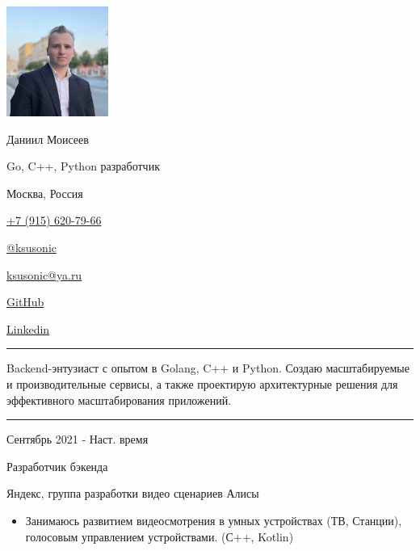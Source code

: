 \documentclass[a4paper,10pt]{article}
\newlength{\cvcolumngapwidth}
\newlength{\cvleftcolumnwidth}
\newlength{\cvrightcolumnwidth}
\newcommand{\cvnamestyle}[1]{{\Large\cvnamefont\textcolor{cvnamecolor}{#1}}}
\newcommand{\cvsectionstyle}[1]{{\normalsize\cvsectionfont\textcolor{cvsectioncolor}{#1}}}
\newcommand{\cvtitlestyle}[1]{{\large\cvtitlefont\textcolor{cvtitlecolor}{#1}}}
\newcommand{\cvdurationstyle}[1]{{\small\cvdurationfont\textcolor{cvdurationcolor}{#1}}}
\newlength{\cvafteritemskipamount}
\newlength{\cvaftersectionskipamount}
\newlength{\cvafternameskipamount}
\newlength{\cvafterpersonalinfolineskipamount}
\newlength{\cvaftertitleskipamount}
\newlength{\cvparskip}
\newcommand{\cvpersonalinfo}[2]{
    \begin{minipage}[t]{\cvleftcolumnwidth}
        \vspace{0mm} %
        \raggedleft #1
    \end{minipage}%
    \hspace{\cvcolumngapwidth}%
    \begin{minipage}[t]{\cvrightcolumnwidth}
        \vspace{0mm} %
        #2
    \end{minipage}

    \vspace{\cvafteritemskipamount}
}
\newcommand{\cvname}[1]{
    \cvnamestyle{#1}

    \vspace{\cvafternameskipamount}
}
\newcommand{\cvpersonalinfolinewithicon}[3]{
    \raisebox{.5\fontcharht\font`E-.5\height}{\texttt{[image: \#2]}}
    #3

    \vspace{\cvafterpersonalinfolineskipamount}
}
\newcommand{\cvsection}[1]{
    \begin{minipage}[t]{\cvleftcolumnwidth}
        \raggedleft\cvsectionstyle{#1}
    \end{minipage}%
    \hspace{\cvcolumngapwidth}%
    \begin{minipage}[t]{\cvrightcolumnwidth}
        \textcolor{cvrulecolor}{\rule{\cvrightcolumnwidth}{0.3mm}}
    \end{minipage}

    \vspace{\cvaftersectionskipamount}
}
\newcommand{\cvitem}[2]{
    \begin{minipage}[t]{\cvleftcolumnwidth}
        \raggedleft #1
    \end{minipage}%
    \hspace{\cvcolumngapwidth}%
    \begin{minipage}[t]{\cvrightcolumnwidth}
        \setlength{\parskip}{\cvparskip} #2
    \end{minipage}

    \vspace{\cvafteritemskipamount}
}
\newcommand{\cvtitle}[1]{
    \cvtitlestyle{#1}

    \vspace{\cvaftertitleskipamount}
    \vspace{-\cvparskip}
}
\begin{document}

\cvpersonalinfo{
    \includegraphics[height=36mm]{img/dan.jpg}
}{
    \cvname{Даниил Моисеев}
    \cvdurationstyle {Go, C++, Python разработчик}

    \cvpersonalinfolinewithicon{height=4mm}{img/072-location.pdf}{Москва, Россия}

    \cvpersonalinfolinewithicon{height=4mm}{img/067-phone.pdf}{
        \href{tel:+79156207966}{+7 (915) 620-79-66}
    }

    \cvpersonalinfolinewithicon{height=4mm}{img/telegram.png}{
        \href{https://t.me/ksusonic}{@ksusonic}
    }

    \cvpersonalinfolinewithicon{height=4mm}{img/070-envelop.pdf}{
        \href{mailto:ksusonic@ya.ru}{ksusonic@ya.ru}
    }

    \cvpersonalinfolinewithicon{height=4mm}{img/github.png}{
        \href{https://github.com/ksusonic}{GitHub}
    }

    \cvpersonalinfolinewithicon{height=4mm}{img/linkedin.png}{
        \href{https://www.linkedin.com/in/ksusonic}{Linkedin}
    }
}


\cvsection{О себе}
\cvitem{
    \cvdurationstyle{}
}{
    Backend-энтузиаст с опытом в Golang, C++ и Python.
    Создаю масштабируемые и производительные сервисы, а также проектирую архитектурные решения для эффективного масштабирования приложений.
}


\cvsection{Опыт работы}

\cvitem{
    \cvdurationstyle{Сентябрь 2021 - Наст. время}
}{
    \cvtitle{Разработчик бэкенда}

    Яндекс, группа разработки видео сценариев Алисы

    \begin{itemize}[leftmargin=*]
        \item Занимаюсь развитием видеосмотрения в умных устройствах (ТВ, Станции), голосовым управлением устройствами. (С++, Kotlin)
    \end{itemize}
}
\end{document}
